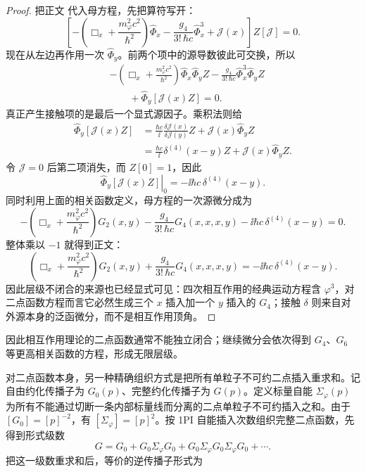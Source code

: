 \begin{proof}
把正文 代入母方程，先把算符写开：
\begin{equation*}
\left[
-\left(\Box_x+\frac{m_\varphi^2c^2}{\hbar^2}\right)\widehat\Phi_x
-\frac{g_4}{3!\,\hbar c}\widehat\Phi_x^3
+\mathcal J(x)
\right]Z[\mathcal J]=0.
\end{equation*}
现在从左边再作用一次 $\widehat\Phi_y$。前两个项中的源导数彼此可交换，所以
\begin{align*}
&-\left(\Box_x+\frac{m_\varphi^2c^2}{\hbar^2}\right)
\widehat\Phi_x\widehat\Phi_yZ
-\frac{g_4}{3!\,\hbar c}
\widehat\Phi_x^3\widehat\Phi_yZ\\
&\qquad
+\widehat\Phi_y\!\left[\mathcal J(x)Z\right]=0.
\end{align*}
真正产生接触项的是最后一个显式源因子。乘积法则给
\begin{align*}
\widehat\Phi_y\!\left[\mathcal J(x)Z\right]
&=\frac{\hbar c}{\ii}
\frac{\delta\mathcal J(x)}{\delta\mathcal J(y)}Z
+\mathcal J(x)\widehat\Phi_yZ\\
&=\frac{\hbar c}{\ii}\delta^{(4)}(x-y)Z
+\mathcal J(x)\widehat\Phi_yZ.
\end{align*}
令 $\mathcal J=0$ 后第二项消失，而 $Z[0]=1$，因此
\begin{equation*}
\left.\widehat\Phi_y[\mathcal J(x)Z]\right|_0
=-\ii\hbar c\,\delta^{(4)}(x-y).
\end{equation*}
同时利用上面的相关函数定义，母方程的一次源微分成为
\begin{equation*}
-\left(\Box_x+\frac{m_\varphi^2c^2}{\hbar^2}\right)G_2(x,y)
-\frac{g_4}{3!\,\hbar c}G_4(x,x,x,y)
-\ii\hbar c\,\delta^{(4)}(x-y)=0.
\end{equation*}
整体乘以 $-1$ 就得到正文：
\begin{equation*}
\left(\Box_x+\frac{m_\varphi^2c^2}{\hbar^2}\right)G_2(x,y)
+\frac{g_4}{3!\,\hbar c}G_4(x,x,x,y)
=-\ii\hbar c\,\delta^{(4)}(x-y).
\end{equation*}
因此层级不闭合的来源也已经显式可见：四次相互作用的经典运动方程含 $\varphi^3$，对二点函数方程而言它必然生成三个 $x$ 插入加一个 $y$ 插入的 $G_4$；接触 $\delta$ 则来自对外源本身的泛函微分，而不是相互作用顶角。
\end{proof}
因此相互作用理论的二点函数通常不能独立闭合；继续微分会依次得到 $G_4$、$G_6$ 等更高相关函数的方程，形成无限层级。

对二点函数本身，另一种精确组织方式是把所有单粒子不可约二点插入重求和。记自由约化传播子为 $G_0(p)$、完整约化传播子为 $G(p)$。定义标量自能 $\Sigma_\varphi(p)$ 为所有不能通过切断一条内部标量线而分离的二点单粒子不可约插入之和。由于 $[G_0]=[p]^{-2}$，有 $[\Sigma_\varphi]=[p]^2$。按 1PI 自能插入次数组织完整二点函数，先得到形式级数
\begin{equation}
 {
 G
 =G_0+G_0\Sigma_\varphi G_0
 +G_0\Sigma_\varphi G_0\Sigma_\varphi G_0+\cdots .}
 \label{eq:exact-dyson-series-scalar-r68}
\end{equation}
把这一级数重求和后，等价的逆传播子形式为


